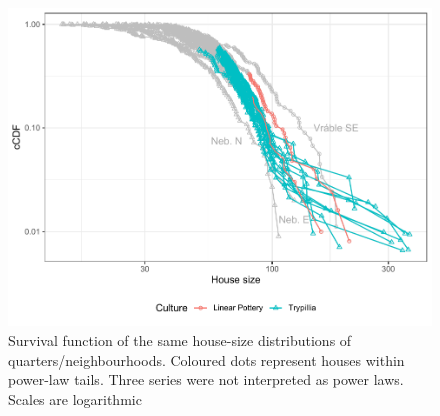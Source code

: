 \documentclass[
  12pt,
  a4paper, twoside]{book}
\begin{document}
\begin{figure}

{\centering \includegraphics[width=0.9\linewidth]{bookdown-demo_files/figure-latex/06-quart-tails-1} 

}

\caption[Power-law tails for house sizes by quarter/neighbourhood]{Survival function of the same house-size distributions of quarters/neighbourhoods. Coloured dots represent houses within power-law tails. Three series were not interpreted as power laws. Scales are logarithmic}\label{fig:06-quart-tails}
\end{figure}
\end{document}
